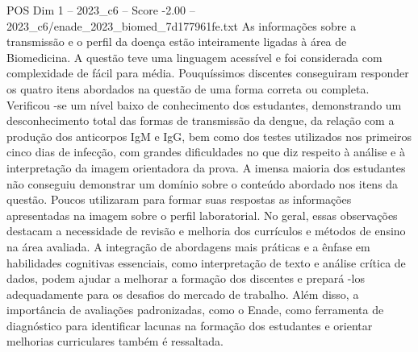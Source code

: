 \begin{textsample}{POS Dim 1 – 2023\_c6 – Score -2.00 – 2023\_c6/enade\_2023\_biomed\_7d177961fe.txt}
As informações sobre a transmissão e o perfil da doença estão inteiramente ligadas à área de Biomedicina.
A questão teve uma linguagem acessível e foi considerada com complexidade de fácil para média.
Pouquíssimos discentes conseguiram responder os quatro itens abordados na questão de uma forma correta ou completa.
Verificou -se um nível baixo de conhecimento dos estudantes, demonstrando um desconhecimento total das formas de transmissão da dengue, da relação com a produção dos anticorpos IgM e IgG, bem como dos testes utilizados nos primeiros cinco dias de infecção, com grandes dificuldades no que diz respeito à análise e à interpretação da imagem orientadora da prova.
A imensa maioria dos estudantes não conseguiu demonstrar um domínio sobre o conteúdo abordado nos itens da questão.
Poucos utilizaram para formar suas respostas as informações apresentadas na imagem sobre o perfil laboratorial.
No geral, essas observações destacam a necessidade de revisão e melhoria dos currículos e métodos de ensino na área avaliada.
A integração de abordagens mais práticas e a ênfase em habilidades cognitivas essenciais, como interpretação de texto e análise crítica de dados, podem ajudar a melhorar a formação dos discentes e prepará -los adequadamente para os desafios do mercado de trabalho.
Além disso, a importância de avaliações padronizadas, como o Enade, como ferramenta de diagnóstico para identificar lacunas na formação dos estudantes e orientar melhorias curriculares também é ressaltada.

\end{textsample}
